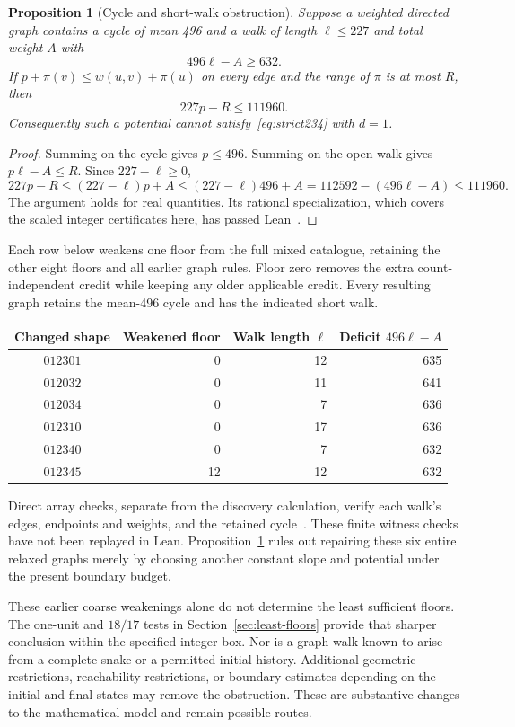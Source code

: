 \documentclass[11pt,a4paper]{article}
\newtheorem{proposition}[theorem]{Proposition}
\theoremstyle{definition}
\theoremstyle{remark}
\begin{document}
\begin{proposition}[Cycle and short-walk obstruction]\label{prop:short-walk-obstruction}
Suppose a weighted directed graph contains a cycle of mean 496 and a walk of length $\ell\le227$ and total weight $A$ with
\[
496\ell-A\ge632.
\]
If $p+\pi(v)\le w(u,v)+\pi(u)$ on every edge and the range of $\pi$ is at most $R$, then
\[
227p-R\le111960.
\]
Consequently such a potential cannot satisfy~\eqref{eq:strict234} with $d=1$.
\end{proposition}
\begin{proof}
Summing on the cycle gives $p\le496$. Summing on the open walk gives $p\ell-A\le R$. Since $227-\ell\ge0$,
\[
227p-R\le(227-\ell)p+A
\le(227-\ell)496+A
=112592-(496\ell-A)\le111960.
\]
The argument holds for real quantities. Its rational specialization, which covers the scaled integer certificates here, has passed Lean~\cite{obstructionarchive}.
\end{proof}

Each row below weakens one floor from the full mixed catalogue, retaining the other eight floors and all earlier graph rules. Floor zero removes the extra count-independent credit while keeping any older applicable credit. Every resulting graph retains the mean-496 cycle and has the indicated short walk.
\begin{center}\small
\begin{tabular}{c r r r}
\toprule
Changed shape & Weakened floor & Walk length $\ell$ & Deficit $496\ell-A$\\\midrule
$012301$ & 0 & 12 & 635\\
$012032$ & 0 & 11 & 641\\
$012034$ & 0 & 7 & 636\\
$012310$ & 0 & 17 & 636\\
$012340$ & 0 & 7 & 632\\
$012345$ & 12 & 12 & 632\\
\bottomrule
\end{tabular}
\end{center}
Direct array checks, separate from the discovery calculation, verify each walk's edges, endpoints and weights, and the retained cycle~\cite{obstructionarchive}. These finite witness checks have not been replayed in Lean. Proposition~\ref{prop:short-walk-obstruction} rules out repairing these six entire relaxed graphs merely by choosing another constant slope and potential under the present boundary budget.

These earlier coarse weakenings alone do not determine the least sufficient floors. The one-unit and $18/17$ tests in Section~\ref{sec:least-floors} provide that sharper conclusion within the specified integer box. Nor is a graph walk known to arise from a complete snake or a permitted initial history. Additional geometric restrictions, reachability restrictions, or boundary estimates depending on the initial and final states may remove the obstruction. These are substantive changes to the mathematical model and remain possible routes.
\end{document}
